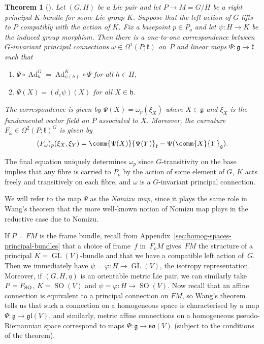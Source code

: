 \documentclass[10pt,a4paper]{amsart}
\numberwithin{equation}{section}
\newtheorem{Theorem}{Theorem}[section]
\newcommand{\fg}{\mathfrak{g}}
\newcommand{\fh}{\mathfrak{h}}
\newcommand{\fk}{\mathfrak{k}}
\newcommand{\fgl}{\mathfrak{gl}}
\newcommand{\fso}{\mathfrak{so}}
\newcommand{\1}{\mathbbm{1}}
\DeclareMathOperator{\GL}{GL}
\DeclareMathOperator{\SO}{SO}
\DeclareMathOperator{\Ad}{Ad}
\begin{document}
\begin{Theorem}[\cite{Wang1958}]\label{thm:Wang}
	Let $(G,H)$ be a Lie pair and let $P\to M=G/H$ be a right principal $K$-bundle for some Lie group $K$. Suppose that the left action of $G$ lifts to $P$ compatibly with the action of $K$. Fix a basepoint $p\in P_o$ and let $\psi\colon H\to K$ be the induced group morphism. Then there is a one-to-one correspondence between~$G$-invariant principal connections $\omega\in\Omega^1(P;\fk)$ on~$P$ and linear maps $\Psi\colon \fg\to\fk$ such that
	\begin{enumerate}\itemsep=0pt
		\item[$(1)$] $\Psi\circ\Ad^G_h = \Ad^K_{\psi(h)}\circ\Psi$ for all $h\in H$,
		\item[$(2)$] $\Psi(X)=(d_e\psi)(X)$ for all $X\in\fh$.
	\end{enumerate}
	The correspondence is given by
$\Psi(X) = \omega_p(\xi_X)
$
	where $X\in \fg$ and $\xi_X$ is the fundamental vector field on $P$ associated to $X$. Moreover, the curvature $F_\omega\in\Omega^2(P;\fk)^G$ is given by
	\[
(F_\omega)_p(\xi_X,\xi_Y) = \comm{\Psi(X)}{\Psi(Y)}_\fk - \Psi(\comm{X}{Y}_\fg).
	\]
\end{Theorem}

The final equation uniquely determines $\omega_p$ since $G$-transitivity on the base implies that any fibre is carried to $P_o$ by the action of some element of $G$, $K$ acts freely and transitively on each fibre, and $\omega$ is a $G$-invariant principal connection.

We will refer to the map $\Psi$ as the \emph{Nomizu map}, since it plays the same role in Wang's theorem that the more well-known notion of Nomizu map plays in the reductive case due to Nomizu.

If $P=FM$ is the frame bundle, recall from Appendix~\ref{sec:homog-spaces-principal-bundles} that a choice of frame~$f$ in~$F_oM$ gives~$FM$ the structure of a principal $K=\GL(V)$-bundle and that we have a compatible left action of~$G$. Then we immediately have $\psi=\varphi\colon H\to\GL(V)$, the isotropy representation. Moreover, if $(G,H,\eta)$ is an orientable metric Lie pair, we can similarly take $P=F_{\rm SO}$, ${K=\SO(V)}$ and $\psi=\varphi\colon H\to\SO(V)$. Now recall that an affine connection is equivalent to a principal connection on $FM$, so Wang's theorem tells us that such a connection on a homogeneous space is characterised by a map $\Psi\colon \fg\to\fgl(V)$, and similarly, metric affine connections on a homogeneous pseudo-Riemannian space correspond to maps $\Psi\colon \fg\to\fso(V)$ (subject to the conditions of the theorem).
\end{document}
